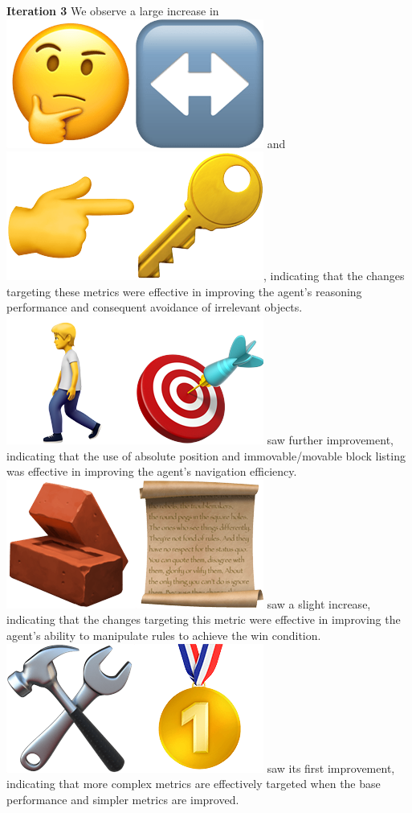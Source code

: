 \textbf{Iteration 3}
We observe a large increase in \includegraphics[scale=0.07]{figs/emojis/emoji_4.png} and \includegraphics[scale=0.07]{figs/emojis/emoji_6.png}, indicating that the changes targeting these metrics were effective in improving the agent's reasoning performance and consequent avoidance of irrelevant objects. \includegraphics[scale=0.07]{figs/emojis/emoji_3.png} saw further improvement, indicating that the use of absolute position and immovable/movable block listing was effective in improving the agent's navigation efficiency. \includegraphics[scale=0.07]{figs/emojis/emoji_7.png} saw a slight increase, indicating that the changes targeting this metric were effective in improving the agent's ability to manipulate rules to achieve the win condition. \includegraphics[scale=0.07]{figs/emojis/emoji_5.png} saw its first improvement, indicating that more complex metrics are effectively targeted when the base performance and simpler metrics are improved.

